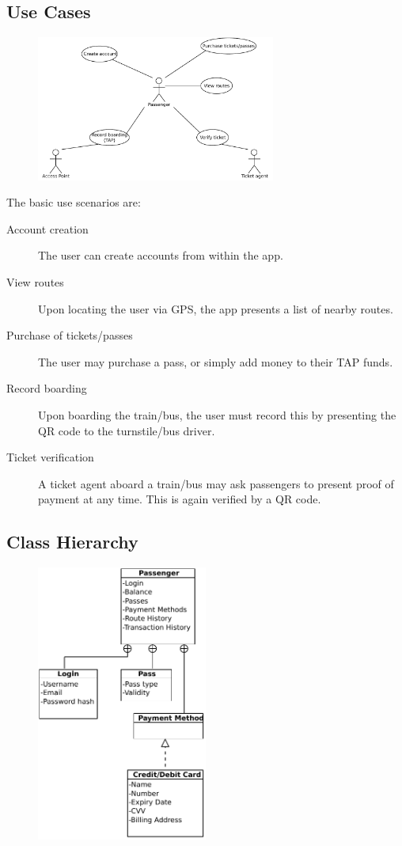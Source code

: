 \subsection{Use Cases}
\begin{figure}[!htbp]
\centering
\includegraphics[width=0.7\textwidth]{arch/usecase.pdf}
\end{figure}

The basic use scenarios are:\begin{description}
\item[Account creation] The user can create accounts from within the app.
\item[View routes] Upon locating the user via GPS, the app presents a list of nearby routes.
\item[Purchase of tickets/passes	] The user may purchase a pass, or simply add money to their TAP funds.
\item[Record boarding] Upon boarding the train/bus, the user must record this by presenting the QR code to the turnstile/bus driver.
\item[Ticket verification] A ticket agent aboard a train/bus may ask passengers to present proof of payment at any time. This is again verified by a QR code.
\end{description}

\clearpage

\subsection{Class Hierarchy}
\begin{figure}[!htbp]
\centering
\includegraphics[width=0.5\textwidth]{arch/classdiagram.pdf}
\end{figure}

